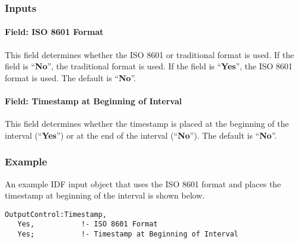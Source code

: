 \subsubsection{Inputs}\label{inputs-for-timestamp}

\paragraph{Field: ISO 8601 Format}\label{field-timestamp-iso8601format}

This field determines whether the ISO 8601 or traditional format is used. If the field is ``\textbf{No}'', the traditional format is
used. If the field is ``\textbf{Yes}'', the ISO 8601 format is used. The default is ``\textbf{No}''.

\paragraph{Field: Timestamp at Beginning of Interval}\label{field-timestamp-beginning}

This field determines whether the timestamp is placed at the beginning of the interval (``\textbf{Yes}'') or at the end of the
interval (``\textbf{No}''). The default is ``\textbf{No}''.

\subsubsection{Example}\label{example-for-timestamp}

An example IDF input object that uses the ISO 8601 format and places the timestamp at beginning of the interval is shown below.
\begin{lstlisting}
OutputControl:Timestamp,
   Yes,           !- ISO 8601 Format
   Yes;           !- Timestamp at Beginning of Interval
\end{lstlisting}


